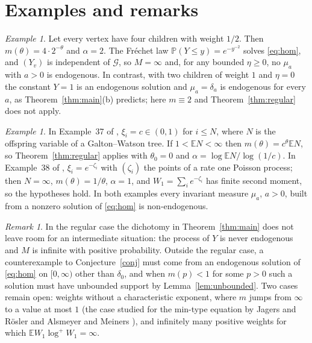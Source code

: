 \documentclass[11pt]{amsart}
\theoremstyle{remark}
\newtheorem{remark}[theorem]{Remark}
\newtheorem{example}[theorem]{Example}
\newcommand{\Ga}{\mathcal{G}}
\newcommand{\Pb}{\mathbb{P}}
\newcommand{\E}{\mathbb{E}}
\begin{document}
\section{Examples and remarks}\label{sec:remarks}

\begin{example}
Let every vertex have four children with weight $1/2$. Then $m(\theta)=4\cdot2^{-\theta}$
and $\alpha=2$. The Fr\'echet law $\Pb(Y\le y)=e^{-y^{-2}}$ solves \eqref{eq:hom}, and
$(Y_v)$ is independent of $\Ga$, so $M=\infty$ and, for any bounded $\eta\ge0$, no $\mu_a$
with $a>0$ is endogenous. In contrast, with two children of weight $1$ and $\eta=0$ the
constant $Y=1$ is an endogenous solution and $\mu_a=\delta_a$ is endogenous for every $a$,
as Theorem~\ref{thm:main}(b) predicts; here $m\equiv2$ and Theorem~\ref{thm:regular} does
not apply.
\end{example}

\begin{example}
In Example~37 of \cite{AB}, $\xi_i=c\in(0,1)$ for $i\le N$, where $N$ is the offspring
variable of a Galton--Watson tree. If $1<\E N<\infty$ then $m(\theta)=c^\theta\E N$, so
Theorem~\ref{thm:regular} applies with $\theta_0=0$ and $\alpha=\log\E N/\log(1/c)$. In
Example~38 of \cite{AB}, $\xi_i=e^{-\zeta_i}$ with $(\zeta_i)$ the points of a rate one
Poisson process; then $N=\infty$, $m(\theta)=1/\theta$, $\alpha=1$, and $W_1=\sum_ie^{-\zeta_i}$
has finite second moment, so the hypotheses hold. In both examples every invariant measure
$\mu_a$, $a>0$, built from a nonzero solution of \eqref{eq:hom} is non-endogenous.
\end{example}

\begin{remark}
In the regular case the dichotomy in Theorem~\ref{thm:main} does not leave room for an
intermediate situation: the process of $Y$ is never endogenous and $M$ is infinite with
positive probability. Outside the regular case, a counterexample to Conjecture~\ref{conj}
must come from an endogenous solution of \eqref{eq:hom} on $[0,\infty)$ other than
$\delta_0$, and when $m(p)<1$ for some $p>0$ such a solution must have unbounded support by
Lemma~\ref{lem:unbounded}. Two cases remain open: weights without a characteristic
exponent, where $m$ jumps from $\infty$ to a value at most $1$ (the case studied for the
min-type equation by Jagers and R\"osler \cite{JR} and Alsmeyer and Meiners \cite{AM}), and
infinitely many positive weights for which $\E W_1\log^+W_1=\infty$.
\end{remark}
\end{document}
